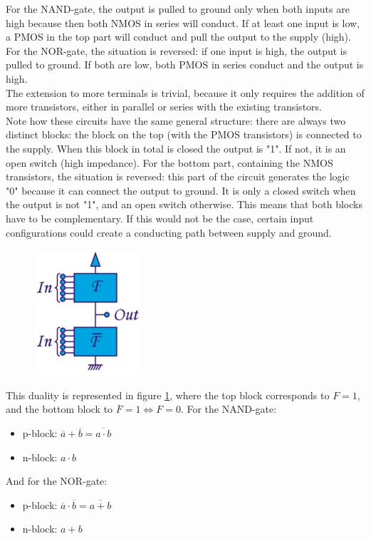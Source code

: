 For the NAND-gate, the output is pulled to ground only when both inputs are high because then both NMOS in series will conduct. If at least one input is low, a PMOS in the top part will conduct and pull the output to the supply (high).\\
For the NOR-gate, the situation is reversed: if one input is high, the output is pulled to ground. If both are low, both PMOS in series conduct and the output is high.\\
The extension to more terminals is trivial, because it only requires the addition of more transistors, either in parallel or series with the existing transistors.\\
Note how these circuits have the same general structure: there are always two distinct blocks: the block on the top (with the PMOS transistors) is connected to the supply. When this block in total is closed the output is "1". If not, it is an open switch (high impedance). For the bottom part, containing the NMOS transistors, the situation is reversed: this part of the circuit generates the logic "0" because it can connect the output to ground. It is only a closed switch when the output is not "1", and an open switch otherwise. This means that both blocks have to be complementary. If this would not be the case, certain input configurations could create a conducting path between supply and ground.\\
\begin{figure}[h!]
	\centering
	\includegraphics[width=4cm]{figures/ch13/cmos1.jpg}
	\caption{}
	\label{fig:cmos1}
\end{figure}
This duality is represented in figure \ref{fig:cmos1}, where the top block corresponds to $F = 1$, and the bottom block to $\overline{F} = 1 \Leftrightarrow F = 0$. For the NAND-gate:
\begin{itemize}
	\item p-block: $\overline{a} + \overline{b} = \overline{a \cdot b}$
	\item n-block: $a \cdot b$
\end{itemize}
And for the NOR-gate:
\begin{itemize}
	\item p-block: $\overline{a} \cdot \overline{b} = \overline{a + b}$
	\item n-block: $a + b$
\end{itemize}

